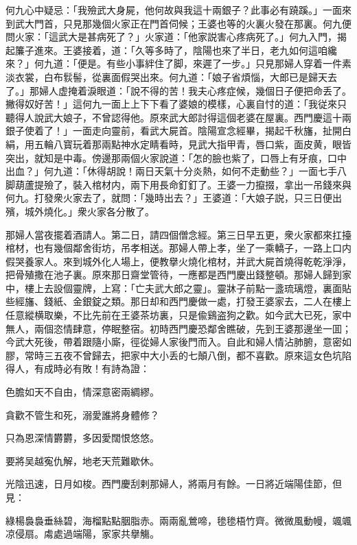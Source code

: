 何九心中疑忌：「我殮武大身屍，他何故與我這十兩銀子？此事必有蹺蹊。」一面來到武大門首，只見那幾個火家正在門首伺候；王婆也等的火裏火發在那裏。何九便問火家：「這武大是甚病死了？」火家道：「他家説害心疼病死了。」何九入門，揭起簾子進來。王婆接着，道：「久等多時了，陰陽也來了半日，老九如何這咱纔來？」何九道：「便是。有些小事絆住了脚，來遲了一步。」只見那婦人穿着一件素淡衣裳，白布䯼髻，從裏面假哭出來。何九道：「娘子省煩惱，大郎已是歸天去了。」那婦人虚掩着淚眼道：「說不得的苦！我夫心疼症候，幾個日子便把命丢了。撇得奴好苦！」這何九一面上上下下看了婆娘的模樣，心裏自忖的道：「我従來只聽得人說武大娘子，不曾認得他。原來武大郎討得這個老婆在屋裏。西門慶這十兩銀子使着了！」一面走向靈前，看武大屍首。陰陽宣念經畢，揭起千秋旛，扯開白絹，用五輪八寳玩着那兩點神水定睛看時，見武大指甲青，唇口紫，面皮黄，眼皆突出，就知是中毒。傍邊那兩個火家說道：「怎的臉也紫了，口唇上有牙痕，口中出血？」何九道：「休得胡說！兩日天氣十分炎熱，如何不走動些？」一面七手八脚葫蘆提殮了，裝入棺材内，兩下用長命釘釘了。王婆一力攛掇，拿出一吊錢來與何九。打發衆火家去了，就問：「幾時出去？」王婆道：「大娘子説，只三日便出殯，城外燒化。」衆火家各分散了。

那婦人當夜擺着酒請人。第二日，請四個僧念經。第三日早五更，衆火家都來扛擡棺材，也有幾個鄰舍街坊，吊孝相送。那婦人帶上孝，坐了一乘轎子，一路上口内假哭養家人。來到城外化人場上，便教擧火燒化棺材，并武大屍首燒得乾乾淨淨，把骨殖撒在池子裏。原來那日齋堂管待，一應都是西門慶出錢整頓。那婦人歸到家中，樓上去設個靈牌，上寫：「亡夫武大郎之靈」。靈牀子前點一盞琉璃燈，裏面貼些經旛、錢紙、金銀錠之類。那日却和西門慶做一處，打發王婆家去，二人在樓上任意縱横取樂，不比先前在王婆茶坊裏，只是偸鷄盗狗之歡。如今武大已死，家中無人，兩個恣情肆意，停眠整宿。初時西門慶恐鄰舍瞧破，先到王婆那邊坐一囬；今武大死後，帶着跟隨小廝，徑從婦人家後門而入。自此和婦人情沾肺腑，意密如膠，常時三五夜不曾歸去，把家中大小丢的七顛八倒，都不喜歡。原來這女色坑陷得人，有成時必有敗！有詩為證：

色膽如天不自由，情深意密兩綢繆。

貪歡不管生和死，溺愛誰將身體修？

只為恩深情欝欝，多因愛闊恨悠悠。

要將吴越寃仇解，地老天荒難歇休。

光陰迅速，日月如梭。西門慶刮剌那婦人，將兩月有餘。一日將近端陽佳節，但見：

綠楊裊裊垂絲碧，海榴點點胭脂赤。兩兩亂鶯啼，毶毶梧竹齊。微微風動幔，颯颯凉侵扇。䖏處過端陽，家家共擧觴。

